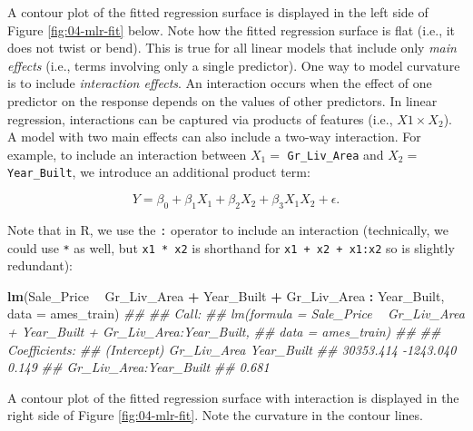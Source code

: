 \documentclass[]{krantz}
\makeatletter
\newenvironment{Shaded}{\begin{snugshade}}{\end{snugshade}}
\newcommand{\CommentTok}[1]{\textcolor[rgb]{0.37,0.37,0.37}{\textit{#1}}}
\newcommand{\DataTypeTok}[1]{\textcolor[rgb]{0.27,0.27,0.27}{#1}}
\newcommand{\KeywordTok}[1]{\textcolor[rgb]{0.27,0.27,0.27}{\textbf{#1}}}
\newcommand{\NormalTok}[1]{#1}
\newcommand{\OperatorTok}[1]{\textcolor[rgb]{0.43,0.43,0.43}{\textbf{#1}}}
\newcommand{\StringTok}[1]{\textcolor[rgb]{0.5,0.5,0.5}{#1}}
\newenvironment{kframe}{%
\medskip{}
\setlength{\fboxsep}{.8em}
 \def\at@end@of@kframe{}%
 \ifinner\ifhmode%
  \def\at@end@of@kframe{\end{minipage}}%
  \begin{minipage}{\columnwidth}%
 \fi\fi%
 \def\FrameCommand##1{\hskip\@totalleftmargin \hskip-\fboxsep
 \colorbox{shadecolor}{##1}\hskip-\fboxsep
     \hskip-\linewidth \hskip-\@totalleftmargin \hskip\columnwidth}%
 \MakeFramed {\advance\hsize-\width
   \@totalleftmargin\z@ \linewidth\hsize
   \@setminipage}}%
 {\par\unskip\endMakeFramed%
 \at@end@of@kframe}
\renewenvironment{Shaded}{\begin{kframe}}{\end{kframe}}
\makeatother
\begin{document}
A contour plot of the fitted regression surface is displayed in the left side of Figure \ref{fig:04-mlr-fit} below. Note how the fitted regression surface is flat (i.e., it does not twist or bend). This is true for all linear models that include only \emph{main effects} (i.e., terms involving only a single predictor). One way to model curvature is to include \emph{interaction effects}. An interaction occurs when the effect of one predictor on the response depends on the values of other predictors. In linear regression, interactions can be captured via products of features (i.e., \(X1 \times X_2\)). A model with two main effects can also include a two-way interaction. For example, to include an interaction between \(X_1 =\) \texttt{Gr\_Liv\_Area} and \(X_2 =\) \texttt{Year\_Built}, we introduce an additional product term:

\begin{equation}
  Y = \beta_0 + \beta_1 X_1 + \beta_2 X_2 + \beta_3 X_1 X_2 + \epsilon.
\end{equation}

Note that in R, we use the \texttt{:} operator to include an interaction (technically, we could use \texttt{*} as well, but \texttt{x1\ *\ x2} is shorthand for \texttt{x1\ +\ x2\ +\ x1:x2} so is slightly redundant):

\begin{Shaded}
\begin{Highlighting}[]
\KeywordTok{lm}\NormalTok{(Sale_Price }\OperatorTok{~}\StringTok{ }\NormalTok{Gr_Liv_Area }\OperatorTok{+}\StringTok{ }\NormalTok{Year_Built }\OperatorTok{+}\StringTok{ }\NormalTok{Gr_Liv_Area }\OperatorTok{:}\StringTok{ }\NormalTok{Year_Built, }
   \DataTypeTok{data =}\NormalTok{ ames_train)}
\CommentTok{## }
\CommentTok{## Call:}
\CommentTok{## lm(formula = Sale_Price ~ Gr_Liv_Area + Year_Built + Gr_Liv_Area:Year_Built, }
\CommentTok{##     data = ames_train)}
\CommentTok{## }
\CommentTok{## Coefficients:}
\CommentTok{##            (Intercept)             Gr_Liv_Area              Year_Built  }
\CommentTok{##              30353.414               -1243.040                   0.149  }
\CommentTok{## Gr_Liv_Area:Year_Built  }
\CommentTok{##                  0.681}
\end{Highlighting}
\end{Shaded}

A contour plot of the fitted regression surface with interaction is displayed in the right side of Figure \ref{fig:04-mlr-fit}. Note the curvature in the contour lines.
\end{document}
